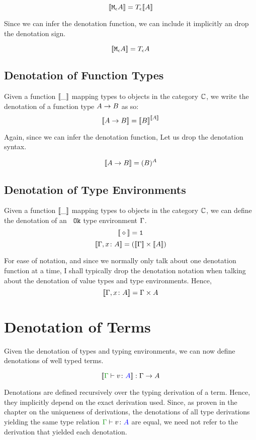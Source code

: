 \documentclass{report}
\begin{document}
$${\bf [\![}\texttt{M}_{\epsilon}{A}{\bf ]\!]} = T_{\epsilon}{{\bf [\![}A{\bf ]\!]}}$$

Since we can infer the denotation function, we can include it implicitly an drop the denotation sign.

$${\bf [\![}\texttt{M}_{\epsilon}{A}{\bf ]\!]} = T_{\epsilon}{A}$$

\subsection{Denotation of Function Types}
Given a function ${\bf [\![}\_{\bf ]\!]}$ mapping types to objects in the category $\mathbb{C}$, we write the denotation of a function type $A\rightarrow B$ as so:
$${\bf [\![}A\rightarrow B{\bf ]\!]} = {\bf [\![}B{\bf ]\!]}^{{\bf [\![}A{\bf ]\!]}}$$

Again, since we can infer the denotation function, Let us drop the denotation syntax.

$${\bf [\![}A\rightarrow B{\bf ]\!]} = (B)^A$$

\subsection{Denotation of Type Environments}
Given a function ${\bf [\![}\_{\bf ]\!]}$ mapping types to objects in the category $\mathbb{C}$, we can define the denotation of an ${\color{blue} } \texttt{ Ok}$ type environment $\Gamma$.
$${\bf [\![}\diamond{\bf ]\!]} = \texttt{1}$$
$${\bf [\![}\Gamma, x\colon A{\bf ]\!]} = ({\bf [\![}\Gamma{\bf ]\!]}\times{\bf [\![}A{\bf ]\!]}) $$

For ease of notation, and since we normally only talk about one denotation function at a time, I shall typically drop the denotation notation when talking about the denotation of value types and type environments. Hence, $${\bf [\![}\Gamma, x\colon A{\bf ]\!]} = \Gamma \times A$$


\section{Denotation of Terms}
Given the denotation of types and typing environments, we can now define denotations of well typed terms.

$$\deno{\gtyperelation{v}{A}}: \G \rightarrow A$$

Denotations are defined recursively over the typing derivation of a term. Hence, they implicitly depend on the exact derivation used. Since, as proven in the chapter on the uniqueness of derivations, the denotations of all type derivations yielding the same type relation $\gtyperelation{v}{A}$ are equal, we need not refer to the derivation that yielded each denotation.
\end{document}
